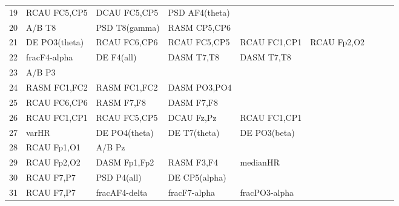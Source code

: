\begin{landscape}
\begin{table}[]
\begin{tabular}{l|llllllll}
19                 & RCAU FC5,CP5         & DCAU FC5,CP5            & PSD AF4(theta)       &                    &                       &                      &                 &                 \\
20                 & A/B T8               & PSD T8(gamma)           & RASM CP5,CP6         &                    &                       &                      &                 &                 \\
21                 & DE PO3(theta)        & RCAU FC6,CP6            & RCAU FC5,CP5         & RCAU FC1,CP1       & RCAU Fp2,O2           &                      &                 &                 \\
22                 & fracF4-alpha         & DE F4(all)              & DASM T7,T8           & DASM T7,T8         &                       &                      &                 &                 \\
23                 & A/B P3               &                         &                      &                    &                       &                      &                 &                 \\
24                 & RASM FC1,FC2         & RASM FC1,FC2            & DASM PO3,PO4         &                    &                       &                      &                 &                 \\
25                 & RCAU FC6,CP6         & RASM F7,F8              & DASM F7,F8           &                    &                       &                      &                 &                 \\
26                 & RCAU FC1,CP1         & RCAU FC5,CP5            & DCAU Fz,Pz           & RCAU FC1,CP1       &                       &                      &                 &                 \\
27                 & varHR                & DE PO4(theta)           & DE T7(theta)         & DE PO3(beta)       &                       &                      &                 &                 \\
28                 & RCAU Fp1,O1          & A/B Pz                  &                      &                    &                       &                      &                 &                 \\
29                 & RCAU Fp2,O2          & DASM Fp1,Fp2            & RASM F3,F4           & medianHR           &                       &                      &                 &                 \\
30                 & RCAU F7,P7           & PSD P4(all)             & DE CP5(alpha)        &                    &                       &                      &                 &                 \\
31                 & RCAU F7,P7           & fracAF4-delta           & fracF7-alpha         & fracPO3-alpha      &                       &                      &                 &                 \\
\end{tabular}
\end{table}
\end{landscape}
